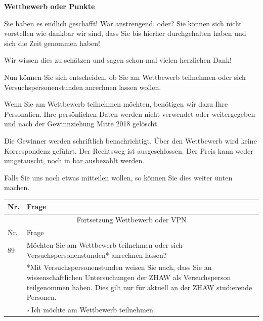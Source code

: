 \begin{flushleft}
\begin{longtable}[c]{ |p{1em} | p{4em} p{4em} p{4em} p{4em} p{4em} p{4em} p{4em}|}
\end{longtable}

\textbf{Wettbewerb oder Punkte}

Sie haben es endlich geschafft! War anstrengend, oder? Sie können sich nicht vorstellen wie dankbar wir sind, dass Sie bis hierher durchgehalten haben und sich die Zeit genommen haben!

\vspace{2mm}
Wir wissen dies zu schätzen und sagen schon mal vielen herzlichen Dank!

\vspace{2mm}
Nun können Sie sich entscheiden, ob Sie am Wettbewerb teilnehmen oder sich Versuchspersonenstunden anrechnen lassen wollen.

\vspace{2mm}
Wenn Sie am Wettbewerb teilnehmen möchten, benötigen wir dazu Ihre Personalien. Ihre persönlichen Daten werden nicht verwendet oder weitergegeben und nach der Gewinnziehung Mitte 2018 gelöscht.

Die Gewinner werden schriftlich benachrichtigt. Über den Wettbewerb wird keine Korrespondenz geführt. Der Rechtsweg ist ausgeschlossen. Der Preis kann weder umgetauscht, noch in bar ausbezahlt werden.

\vspace{2mm}
Falls Sie uns noch etwas mitteilen wollen, so können Sie dies weiter unten machen.

\begin{longtable}[c]{ |p{1em}|p{35em}|} 
  \hline
  Nr. & \multicolumn{1}{|l|}{Frage} \\
  \hline
  \endfirsthead
 
  \hline
  \multicolumn{2}{|c|}{ Fortsetzung Wettbewerb oder VPN}\\
  \hline
  Nr. & \multicolumn{1}{|l|}{Frage} \\
  \hline
  \endhead
 
  \hline
  \endfoot
 
  \hline\hline
  \endlastfoot
  
  89 & Möchten Sie am Wettbewerb teilnehmen oder sich Versuchspersonenstunden* anrechnen lassen? \\
  & *Mit Versuchspersonenstunden weisen Sie nach, dass Sie an wissenschaftlichen Untersuchungen der ZHAW als Versuchsperson teilgenommen haben. Dies gilt nur für aktuell an der ZHAW studierende Personen. \\
  & $\square$ Ich möchte am Wettbewerb teilnehmen.\\
  

\end{longtable}
\end{flushleft}
